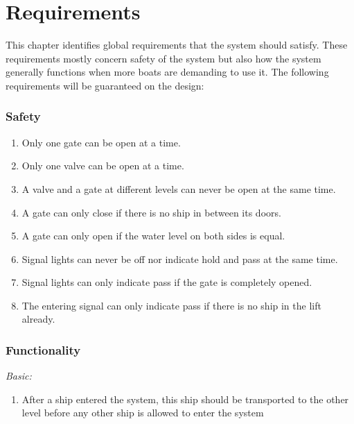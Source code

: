 \section{Requirements}
This chapter identifies global requirements that the system should satisfy. These requirements mostly concern safety of the system but also how the system generally functions when more boats are demanding to use it. The following requirements will be guaranteed on the design:

\subsubsection*{Safety}
\begin{enumerate}
	\item Only one gate can be open at a time.
	\item Only one valve can be open at a time.
	\item A valve and a gate at different levels can never be open at the same time.
	\item A gate can only close if there is no ship in between its doors.
	\item A gate can only open if the water level on both sides is equal.
	\item Signal lights can never be off nor indicate hold and pass at the same time.
	\item Signal lights can only indicate pass if the gate is completely opened.
	\item The entering signal can only indicate pass if there is no ship in the lift already.
\end{enumerate}

\subsubsection*{Functionality}
\textit{Basic:}
\begin{enumerate}
	\item After a ship entered the system, this ship should be transported to the other level before any other ship is allowed to enter the system
\end{enumerate}

